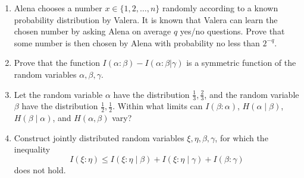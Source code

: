 \documentclass[a4paper]{article}
\begin{document}
\begin{enumerate}
\item Alena chooses a number $x \in \{1, 2, \dots, n\}$ randomly according to a known probability distribution by Valera. It is known that Valera can learn the chosen number by asking Alena on average $q$ yes/no questions. Prove that some number is then chosen by Alena with probability no less than $2^{-q}$.

\item Prove that the function $I(\alpha:\beta) - I(\alpha:\beta | \gamma)$ is a symmetric function of the random variables $\alpha, \beta, \gamma$.

\item Let the random variable $\alpha$ have the distribution $\frac{1}{3}, \frac{2}{3}$, and the random variable $\beta$ have the distribution $\frac{1}{2}, \frac{1}{2}$. Within what limits can $I(\beta:\alpha)$, $H(\alpha \mid \beta)$, $H(\beta \mid \alpha)$, and $H(\alpha, \beta)$ vary?

\item Construct jointly distributed random variables $\xi, \eta, \beta, \gamma$, for which the inequality
$$ I(\xi : \eta) \leq I(\xi : \eta \mid \beta) + I(\xi : \eta \mid \gamma) + I(\beta : \gamma) $$
does not hold.

\end{enumerate}
\end{document}
